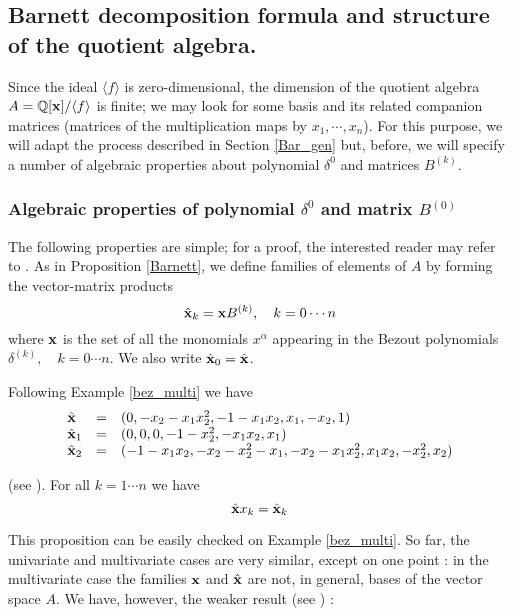 \documentclass{standalone}
\begin{document}
\subsection{Barnett decomposition formula and structure of the quotient algebra.}
Since the ideal $\langle f\rangle$ is zero-dimensional, the dimension of the quotient algebra $A = \mathbb{Q}[\bold{x}]/\langle f\rangle$ is finite; we may look for some basis and its related companion matrices (matrices of the multiplication maps by $x_1,\cdots, x_n$). 
For this purpose, we will adapt the process described in Section \ref{Bar_gen} but, before, we will specify a number of algebraic properties about polynomial $\delta^0$ and matrices $B^{(k)}$.

\subsubsection{Algebraic properties of polynomial $\delta^0$ and matrix $B^{(0)}$}
The following properties are simple; for a proof, the interested reader may refer to \cite{jpc}. As in Proposition \ref{Barnett}, we define families of elements of $A$ by forming the vector-matrix products
\begin{equation}
		\hat{\bold{x}}_k  =  \bold{x}B^{(k)}, \quad k=0\cdots n
\end{equation}
where $\bold{x}$ is the set of all the monomials $x^\alpha$ appearing in the Bezout polynomials $\delta^{(k)}, \quad k=0\cdots n$. We also write $\hat{\bold{x}}_0 = \hat{\bold{x}}$.
\begin{exmp}
Following Example \ref{bez_multi} we have
\begin{equation}
	\begin{array}{lll}
		\hat{\bold{x}} & = & (0, -x_2 - x_1x_2^2, -1 - x_1x_2, x_1, -x_2, 1) \\
		\hat{\bold{x}}_1 & = & (0, 0, 0, -1 - x_2^2, -x_1x_2, x_1) \\
		\hat{\bold{x}}_2 & = & (-1 - x_1x_2, -x_2 - x_2^2 - x_1, - x_2 - x_1x_2^2, x_1x_2, -x_2^2, x_2)
	\end{array}
\end{equation}
\end{exmp}

\begin{prop}
\label{xj} (see \cite{jpc}).
For all $k=1\cdots n$ we have
\begin{equation}
    \hat{\bold{x}}x_k = \hat{\bold{x}}_k
\end{equation}
\end{prop}
This proposition can be easily checked on Example \ref{bez_multi}. 
So far, the univariate and multivariate cases are very similar, except on one point : in the multivariate case the families $\bold{x}$ and $\hat{\bold{x}}$ are not, in general, bases of the vector space $A$. We have, however, the weaker result (see \cite{jpc}) :
\end{document}
